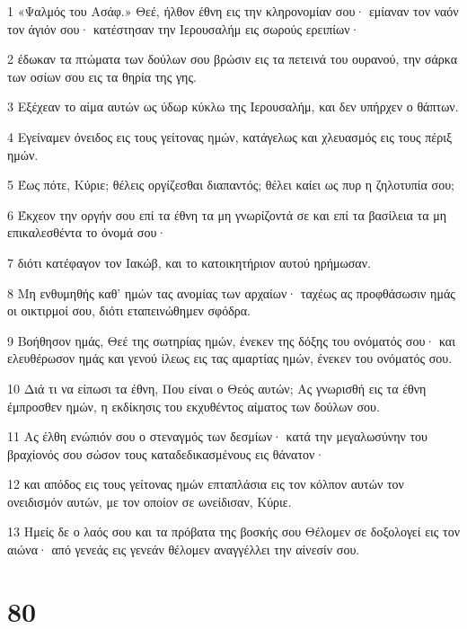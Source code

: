 \par 1 «Ψαλμός του Ασάφ.» Θεέ, ήλθον έθνη εις την κληρονομίαν σου· εμίαναν τον ναόν τον άγιόν σου· κατέστησαν την Ιερουσαλήμ εις σωρούς ερειπίων·
\par 2 έδωκαν τα πτώματα των δούλων σου βρώσιν εις τα πετεινά του ουρανού, την σάρκα των οσίων σου εις τα θηρία της γης.
\par 3 Εξέχεαν το αίμα αυτών ως ύδωρ κύκλω της Ιερουσαλήμ, και δεν υπήρχεν ο θάπτων.
\par 4 Εγείναμεν όνειδος εις τους γείτονας ημών, κατάγελως και χλευασμός εις τους πέριξ ημών.
\par 5 Έως πότε, Κύριε; θέλεις οργίζεσθαι διαπαντός; θέλει καίει ως πυρ η ζηλοτυπία σου;
\par 6 Έκχεον την οργήν σου επί τα έθνη τα μη γνωρίζοντά σε και επί τα βασίλεια τα μη επικαλεσθέντα το όνομά σου·
\par 7 διότι κατέφαγον τον Ιακώβ, και το κατοικητήριον αυτού ηρήμωσαν.
\par 8 Μη ενθυμηθής καθ' ημών τας ανομίας των αρχαίων· ταχέως ας προφθάσωσιν ημάς οι οικτιρμοί σου, διότι εταπεινώθημεν σφόδρα.
\par 9 Βοήθησον ημάς, Θεέ της σωτηρίας ημών, ένεκεν της δόξης του ονόματός σου· και ελευθέρωσον ημάς και γενού ίλεως εις τας αμαρτίας ημών, ένεκεν του ονόματός σου.
\par 10 Διά τι να είπωσι τα έθνη, Που είναι ο Θεός αυτών; Ας γνωρισθή εις τα έθνη έμπροσθεν ημών, η εκδίκησις του εκχυθέντος αίματος των δούλων σου.
\par 11 Ας έλθη ενώπιόν σου ο στεναγμός των δεσμίων· κατά την μεγαλωσύνην του βραχίονός σου σώσον τους καταδεδικασμένους εις θάνατον·
\par 12 και απόδος εις τους γείτονας ημών επταπλάσια εις τον κόλπον αυτών τον ονειδισμόν αυτών, με τον οποίον σε ωνείδισαν, Κύριε.
\par 13 Ημείς δε ο λαός σου και τα πρόβατα της βοσκής σου Θέλομεν σε δοξολογεί εις τον αιώνα· από γενεάς εις γενεάν θέλομεν αναγγέλλει την αίνεσίν σου.

\chapter{80}

